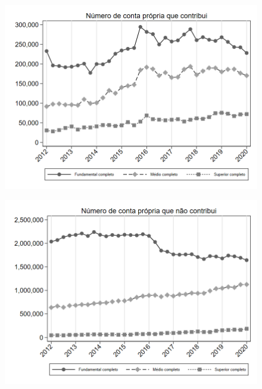 \begin{frame}[label=_composicao_demografica_educacao_n_cpropriaC]{}
\textit{\hyperlink{_composicao_demografica_educacao}{}}
\begin{figure}
  \centering
  \includegraphics[width=1.0\linewidth]{../../analysis/output/composicao_demografica/educacao/_composicao_demografica_educacao_n_cpropriaC.png}
  \caption{}
  \label{fig:_composicao_demografica_educacao_n_cpropriaC}
\end{figure}
\end{frame}

\begin{frame}[label=_composicao_demografica_educacao_n_cpropriaNc]{}
\textit{\hyperlink{_composicao_demografica_educacao}{}}
\begin{figure}
  \centering
  \includegraphics[width=1.0\linewidth]{../../analysis/output/composicao_demografica/educacao/_composicao_demografica_educacao_n_cpropriaNc.png}
  \caption{}
  \label{fig:_composicao_demografica_educacao_n_cpropriaNc}
\end{figure}
\end{frame}
